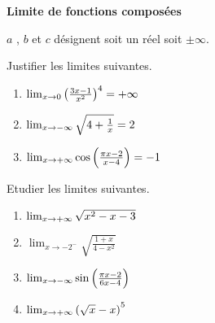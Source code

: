 
\everymath{\displaystyle}


  \summary{}
 \hspace*{5cm}\textbf{ Limite de fonctions composées} 
\medskip

$a $ , $b $ \; et \; $ c $ désignent soit un réel soit $ \pm\infty $.

\medskip
 \hspace*{5cm}
 \medskip
 
\begin{exercice}
  Justifier  les limites suivantes.
\begin{enumerate}
\item  $ \lim_{x \to 0}\left(\frac{3x-1}{x^2}\right)^{4}=+\infty$
\item   $\lim_{x \to -\infty}  \sqrt{4+\frac{1}{x}}=2$ 
 \item  $\lim_{x \to +\infty}\cos\left(\frac{\pi x-2}{x-4}\right) =-1$
 \end{enumerate}
\end{exercice}
\bigskip


\begin{exercice}
Etudier   les limites suivantes.
\medskip

\begin{enumerate}
\item $ \lim_{x \to +\infty}\sqrt{x^2-x-3}$
\item   $\lim_{x \to -2^{-}}  \sqrt{\frac{1+x}{4-x^2}}$  
\item    $\lim_{x \to -\infty}\sin\left(\frac{\pi x-2}{6x-4}\right)$
\item   $\lim_{x \to +\infty}\left(\sqrt{x}-x\right)^5$
\end{enumerate}
\end{exercice}
\bigskip


